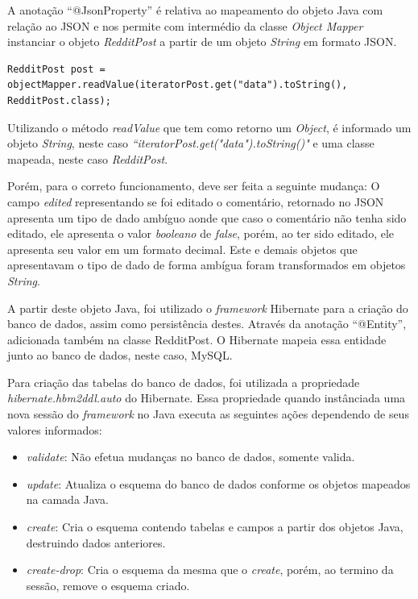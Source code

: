 A anotação ``@JsonProperty'' é relativa ao
mapeamento do objeto Java com relação ao \ac{JSON} e nos permite com
intermédio da classe \textit{Object Mapper} instanciar o objeto
\textit{RedditPost} a partir de um objeto \textit{String} em formato \ac{JSON}. 

\begin{lstlisting}
RedditPost post = objectMapper.readValue(iteratorPost.get("data").toString(),
RedditPost.class);
\end{lstlisting}

Utilizando o método \textit{readValue} que tem como retorno um \textit{Object},
é informado um objeto \textit{String}, neste caso
\textit{``iteratorPost.get("data").toString()"} e uma classe mapeada, neste caso
\textit{RedditPost}.

Porém, para o correto funcionamento, deve ser feita a seguinte mudança: O campo
\textit{edited} representando se foi editado o comentário, retornado no
\ac{JSON} apresenta um tipo de dado ambíguo aonde que caso o comentário não tenha sido editado, ele apresenta o valor \textit{booleano} de \textit{false}, porém, ao ter sido editado, ele apresenta
seu valor em um formato decimal. Este e demais objetos que apresentavam o tipo
de dado de forma ambígua foram transformados em objetos \textit{String}.


A partir deste objeto Java, foi utilizado o \textit{framework} Hibernate para a
criação do banco de dados, assim como persistência destes. Através da anotação
``@Entity'', adicionada também na classe RedditPost. O Hibernate mapeia essa
entidade junto ao banco de dados, neste caso, MySQL.

Para criação das tabelas do banco de dados, foi utilizada a propriedade
\textit{hibernate.hbm2ddl.auto} do Hibernate. Essa propriedade quando
instânciada uma nova sessão do \textit{framework} no Java executa as seguintes
ações dependendo de seus valores informados:


\begin{itemize}
  \item \textit{validate}: Não efetua mudanças no banco de dados, somente
  valida.
  \item \textit{update}: Atualiza o esquema do banco de dados conforme os
  objetos mapeados na camada Java.
  \item \textit{create}: Cria o esquema contendo tabelas e campos a partir dos
  objetos Java, destruindo dados anteriores.
  \item \textit{create-drop}: Cria o esquema da mesma que o \textit{create},
  porém, ao termino da sessão, remove o esquema criado.
\end{itemize}

